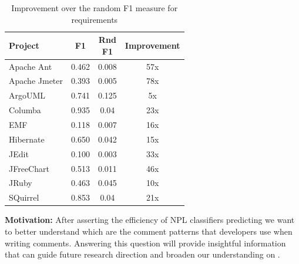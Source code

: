 \begin{table}[!hbt]
    \begin{center}
        \caption{Improvement over the random F1 measure for requirements}
        \label{tbl:improvement_f1measure_requirement}
        \begin{tabular}{l| c c c }
        \toprule
        \textbf{Project} & \textbf{F1} & \thead{Rnd\\F1} & \textbf{Improvement}\\
        \midrule
         Apache Ant      & 0.462       &  0.008          & 57x\\
         Apache Jmeter   & 0.393       &  0.005          & 78x\\
         ArgoUML         & 0.741       &  0.125          & 5x \\
         Columba         & 0.935       &   0.04          & 23x\\
         EMF             & 0.118       &  0.007          & 16x\\
         Hibernate       & 0.650       &  0.042          & 15x\\
         JEdit           & 0.100       &  0.003          & 33x\\
         JFreeChart      & 0.513       &  0.011          & 46x\\
         JRuby           & 0.463       &  0.045          & 10x\\
         SQuirrel        & 0.853       &   0.04          & 21x\\
        \bottomrule
        \end{tabular}
    \end{center}    
\end{table}



\vspace{3mm}
\noindent\rqii
\vspace{3mm}

\noindent \textbf{Motivation:} After asserting the efficiency of NPL classifiers predicting \SATD we want to better understand which are the comment patterns that developers use when writing \SATD comments. Answering this question will provide insightful information that can guide future research direction and broaden our understanding on \SATD.     

